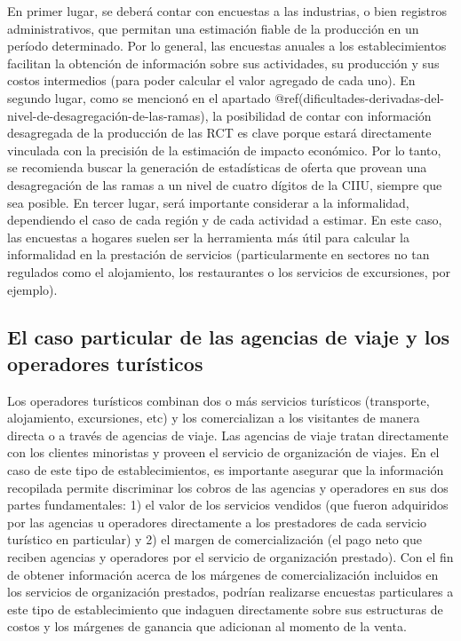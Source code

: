 \documentclass[
  openany]{book}
\begin{document}
En primer lugar, se deberá contar con encuestas a las industrias, o bien registros administrativos, que permitan una estimación fiable de la producción en un período determinado. Por lo general, las encuestas anuales a los establecimientos facilitan la obtención de información sobre sus actividades, su producción y sus costos intermedios (para poder calcular el valor agregado de cada uno). En segundo lugar, como se mencionó en el apartado @ref(dificultades-derivadas-del-nivel-de-desagregación-de-las-ramas), la posibilidad de contar con información desagregada de la producción de las RCT es clave porque estará directamente vinculada con la precisión de la estimación de impacto económico. Por lo tanto, se recomienda buscar la generación de estadísticas de oferta que provean una desagregación de las ramas a un nivel de cuatro dígitos de la CIIU, siempre que sea posible. En tercer lugar, será importante considerar a la informalidad, dependiendo el caso de cada región y de cada actividad a estimar. En este caso, las encuestas a hogares suelen ser la herramienta más útil para calcular la informalidad en la prestación de servicios (particularmente en sectores no tan regulados como el alojamiento, los restaurantes o los servicios de excursiones, por ejemplo).

\hypertarget{el-caso-particular-de-las-agencias-de-viaje-y-los-operadores-turuxedsticos}{%
\subsection{El caso particular de las agencias de viaje y los operadores turísticos}\label{el-caso-particular-de-las-agencias-de-viaje-y-los-operadores-turuxedsticos}}

Los operadores turísticos combinan dos o más servicios turísticos (transporte, alojamiento, excursiones, etc) y los comercializan a los visitantes de manera directa o a través de agencias de viaje. Las agencias de viaje tratan directamente con los clientes minoristas y proveen el servicio de organización de viajes. En el caso de este tipo de establecimientos, es importante asegurar que la información recopilada permite discriminar los cobros de las agencias y operadores en sus dos partes fundamentales: 1) el valor de los servicios vendidos (que fueron adquiridos por las agencias u operadores directamente a los prestadores de cada servicio turístico en particular) y 2) el margen de comercialización (el pago neto que reciben agencias y operadores por el servicio de organización prestado). Con el fin de obtener información acerca de los márgenes de comercialización incluidos en los servicios de organización prestados, podrían realizarse encuestas particulares a este tipo de establecimiento que indaguen directamente sobre sus estructuras de costos y los márgenes de ganancia que adicionan al momento de la venta.
\end{document}
